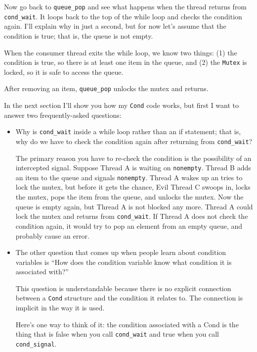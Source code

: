 \documentclass[12pt]{book}
\begin{document}
{Now go back to \verb"queue_pop" and see what happens when the thread
returns from \verb"cond_wait".  It loops back to the top of the while
loop and checks the condition again.  I'll explain why in just a
second, but for now let's assume that the condition is true; that is,
the queue is not empty.

When the consumer thread exits the while loop, we know two things: (1)
the condition is true, so there is at least one item in the queue, and
(2) the {\tt Mutex} is locked, so it is safe to access the queue.

After removing an item, \verb"queue_pop" unlocks the mutex
and returns.

In the next section I'll show you how my {\tt Cond} code works, but first I
want to answer two frequently-asked questions:

\begin{itemize}

\item Why is \verb"cond_wait" inside a while loop rather than an if
statement; that is, why do we have to check the condition again after
returning from \verb"cond_wait"?

The primary reason you have to re-check the condition is the possibility
of an intercepted signal.  Suppose Thread A is waiting on {\tt nonempty}.
Thread B adds an item to the queue and signals {\tt nonempty}.  Thread
A wakes up an tries to lock the mutex, but before it gets the chance,
Evil Thread C swoops in, locks the mutex, pops the item from the
queue, and unlocks the mutex.  Now the queue is empty again, but
Thread A is not blocked any more.  Thread A could lock the mutex and
returns from \verb"cond_wait".  If Thread A does not check the condition
again, it would try to pop an element from an empty queue, and probably
cause an error.

\item The other question that comes up when people learn about condition
variables is ``How does the condition variable know what condition it
is associated with?''

This question is understandable because there is no explicit connection
between a {\tt Cond} structure and the condition it relates to.  The
connection is implicit in the way it is used.

Here's one way to think of it: the condition associated with a Cond
is the thing that is false when you call \verb"cond_wait" and true
when you call \verb"cond_signal".

\end{itemize}

}
\end{document}
